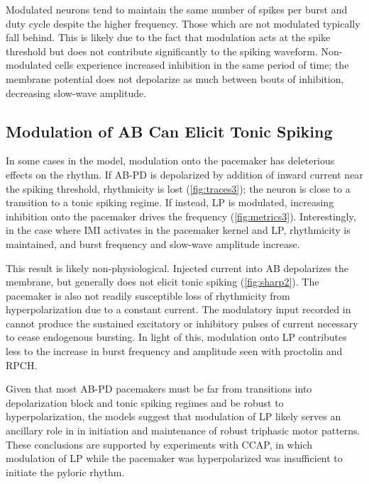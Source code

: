 Modulated neurons tend to maintain the same number of spikes per burst and duty cycle despite the higher frequency\autocite{EisenMechanismsunderlyingpattern1982,SwensenMultiplepeptidesconverge2000}. Those which are not modulated typically fall behind. This is likely due to the fact that modulation acts at the spike threshold but does not contribute significantly to the spiking waveform. Non-modulated cells experience increased inhibition in the same period of time; the membrane potential does not depolarize as much between bouts of inhibition, decreasing slow-wave amplitude.

\subsection{Modulation of AB Can Elicit Tonic Spiking}

In some cases in the model, modulation onto the pacemaker has deleterious effects on the rhythm. If \acs{AB}-\acs{PD} is depolarized by addition of inward current near the spiking threshold, rhythmicity is lost (\autoref{fig:traces3}); the neuron is close to a transition to a tonic spiking regime. If instead, \acs{LP} is modulated, increasing inhibition onto the pacemaker drives the frequency (\autoref{fig:metrics3}). Interestingly, in the case where \acs{IMI} activates in the pacemaker kernel and \acs{LP}, rhythmicity is maintained, and burst frequency and slow-wave amplitude increase.

This result is likely non-physiological. Injected current into \acs{AB} depolarizes the membrane, but generally does not elicit tonic spiking (\autoref{fig:sharp2})\autocite{SwensenModulatorsconvergentcellular2001,Soto-TrevinoComputationalmodelelectrically2005}. The pacemaker is also not readily susceptible loss of rhythmicity from hyperpolarization due to a constant current\autocite{Soto-TrevinoComputationalmodelelectrically2005}. The modulatory input recorded in \citeauthor{SwensenModulatorsconvergentcellular2001}\autocite{SwensenModulatorsconvergentcellular2001} cannot produce the sustained excitatory or inhibitory pulses of current necessary to cease endogenous bursting. In light of this, modulation onto \acs{LP} contributes less to the increase in burst frequency and amplitude seen with proctolin and \acs{RPCH}. 

Given that most \acs{AB}-\acs{PD} pacemakers must be far from transitions into depolarization block and tonic spiking regimes and be robust to hyperpolarization\autocite{WeimannModulationOscillatorInteractions1997,Harris-WarrickDynamicBiologicalNetworks1992}, the models suggest that modulation of \acs{LP} likely serves an ancillary role in in initiation and maintenance of robust triphasic motor patterns. These conclusions are supported by experiments with \ac{CCAP}, in which modulation of \acs{LP} while the pacemaker was hyperpolarized was insufficient to initiate the pyloric rhythm\autocite{WeimannModulationOscillatorInteractions1997}.


